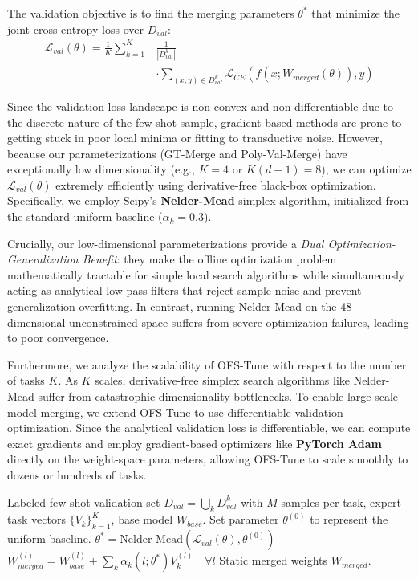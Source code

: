 The validation objective is to find the merging parameters $\theta^*$ that minimize the joint cross-entropy loss over $D_{val}$:
\begin{equation}
\begin{split}
\mathcal{L}_{val}(\theta) = \frac{1}{K} \sum_{k=1}^K & \frac{1}{|D_{val}^k|} \\
& \cdot \sum_{(x, y) \in D_{val}^k} \mathcal{L}_{CE}\left(f(x; W_{merged}(\theta)), y\right)
\end{split}
\end{equation}

Since the validation loss landscape is non-convex and non-differentiable due to the discrete nature of the few-shot sample, gradient-based methods are prone to getting stuck in poor local minima or fitting to transductive noise. However, because our parameterizations (GT-Merge and Poly-Val-Merge) have exceptionally low dimensionality (e.g., $K=4$ or $K(d+1)=8$), we can optimize $\mathcal{L}_{val}(\theta)$ extremely efficiently using derivative-free black-box optimization. Specifically, we employ Scipy's \textbf{Nelder-Mead} simplex algorithm, initialized from the standard uniform baseline ($\alpha_k = 0.3$).

Crucially, our low-dimensional parameterizations provide a \emph{Dual Optimization-Generalization Benefit}: they make the offline optimization problem mathematically tractable for simple local search algorithms while simultaneously acting as analytical low-pass filters that reject sample noise and prevent generalization overfitting. In contrast, running Nelder-Mead on the 48-dimensional unconstrained space suffers from severe optimization failures, leading to poor convergence.

Furthermore, we analyze the scalability of OFS-Tune with respect to the number of tasks $K$. As $K$ scales, derivative-free simplex search algorithms like Nelder-Mead suffer from catastrophic dimensionality bottlenecks. To enable large-scale model merging, we extend OFS-Tune to use differentiable validation optimization. Since the analytical validation loss is differentiable, we can compute exact gradients and employ gradient-based optimizers like \textbf{PyTorch Adam} directly on the weight-space parameters, allowing OFS-Tune to scale smoothly to dozens or hundreds of tasks.

\begin{algorithm}[tb]
\caption{Offline Few-Shot Validation Tuning (OFS-Tune)}
\label{alg:ofs_tune}
\begin{algorithmic}[1]
 Labeled few-shot validation set $D_{val} = \bigcup_k D_{val}^k$ with $M$ samples per task, expert task vectors $\{V_k\}_{k=1}^K$, base model $W_{base}$.
 Set parameter $\theta^{(0)}$ to represent the uniform baseline.
\STATE $\theta^* = \text{Nelder-Mead}\left(\mathcal{L}_{val}(\theta), \theta^{(0)}\right)$
\STATE $W_{merged}^{(l)} = W_{base}^{(l)} + \sum_k \alpha_k(l; \theta^*) V_k^{(l)} \quad \forall l$
 Static merged weights $W_{merged}$.
\end{algorithmic}
\end{algorithm}

